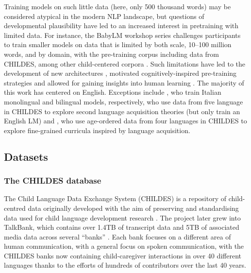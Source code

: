 Training models on such little data (here, only 500 thousand words) may be considered atypical in the modern NLP landscape, but questions of developmental plausibility have led to an increased interest in pretraining with limited data. For instance, the BabyLM workshop series challenges participants to train smaller models on data that is limited by both scale, 10--100 million words, and by domain, with the pre-training corpus including data from CHILDES, among other child-centered corpora \citep{warstadt-2023-babylm-findings, hu-etal-2024-findings}. Such limitations have led to the development of new architectures \citep{georges-gabriel-charpentier-samuel-2023-layers, charpentier2024gpt}, motivated cognitively-inspired pre-training strategies \citep{huebner-etal-2021-babyberta, martinez-etal-2023-climb} and allowed for gaining insights into human learning \citep{yedetore-etal-2023-poor}. The majority of this work has centered on English. Exceptions include \citet{capone2024babies, shen2024bambino}, who train Italian monolingual and bilingual models, respectively, \citet{yadavalli2023slabert} who use data from five language in CHILDES to explore second language acquisition theories (but only train an English LM) and \citet{salhan-etal-2024-less}, who use age-ordered data from four languages in CHILDES to explore fine-grained curricula inspired by language acquisition.

\subsection{Datasets}

\subsubsection{The CHILDES database}


The Child Language Data Exchange System (CHILDES) is a repository of child-centred data originally developed with the aim of preserving and standardising data used for child language development research \citep{macwhinney1985child}. The project later grew into TalkBank, which contains over 1.4TB of transcript data and 5TB of associated media data across several ``banks'' \citep{macwhinney_understanding_2019}. Each bank focuses on a different area of human communication, with a general focus on spoken communication, with the CHILDES banks now containing child-caregiver interactions in over 40 different languages thanks to the efforts of hundreds of contributors over the last 40 years. 

